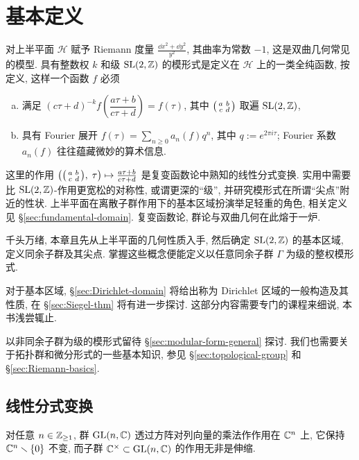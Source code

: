 
\chapter{基本定义}
对上半平面 $\mathcal{H}$ 赋予 Riemann 度量 $\frac{\dd x^2 + \dd y^2}{y^2}$, 其曲率为常数 $-1$, 这是双曲几何常见的模型. 具有整数权 $k$ 和级 $\operatorname{SL}(2,\mathbb{Z})$ 的模形式是定义在 $\mathcal{H}$ 上的一类全纯函数, 按定义, 这样一个函数 $f$ 必须
\begin{enumerate}[(a)]
	\item 满足 $(c\tau + d)^{-k} f\left( \dfrac{a\tau+b}{c\tau+d} \right) = f(\tau)$, 其中 $\bigl(\begin{smallmatrix} a & b \\ c & d \end{smallmatrix}\bigr)$ 取遍 $\operatorname{SL}(2,\mathbb{Z})$, 
	\item 具有 Fourier 展开 $f(\tau) = \sum_{n \geq 0} a_n(f) q^n$, 其中 $q := e^{2\pi i\tau}$; Fourier 系数 $a_n(f)$ 往往蕴藏微妙的算术信息.
\end{enumerate}
这里的作用 $\left( \bigl(\begin{smallmatrix} a & b \\ c & d \end{smallmatrix}\bigr), \; \tau \right) \mapsto \frac{a\tau+b}{c\tau+d}$ 是复变函数论中熟知的线性分式变换. 实用中需要比 $\operatorname{SL}(2,\mathbb{Z})$-作用更宽松的对称性, 或谓更深的``级'', 并研究模形式在所谓``尖点''附近的性状. 上半平面在离散子群作用下的基本区域扮演举足轻重的角色, 相关定义见 \S\ref{sec:fundamental-domain}. 复变函数论, 群论与双曲几何在此熔于一炉.

千头万绪, 本章且先从上半平面的几何性质入手, 然后确定 $\operatorname{SL}(2,\mathbb{Z})$ 的基本区域, 定义同余子群及其尖点. 掌握这些概念便能定义以任意同余子群 $\Gamma$ 为级的整权模形式.

对于基本区域, \S\ref{sec:Dirichlet-domain} 将给出称为 Dirichlet 区域的一般构造及其性质, 在 \S\ref{sec:Siegel-thm} 将有进一步探讨. 这部分内容需要专门的课程来细说, 本书浅尝辄止.

以非同余子群为级的模形式留待 \S\ref{sec:modular-form-general} 探讨. 我们也需要关于拓扑群和微分形式的一些基本知识, 参见 \S\ref{sec:topological-group} 和 \S\ref{sec:Riemann-basics}.

\section{线性分式变换}\label{sec:linear-fractional-transform}
对任意 $n \in \mathbb{Z}_{\geq 1}$, 群 $\operatorname{GL}(n,\mathbb{C})$ 透过方阵对列向量的乘法作作用在 $\mathbb{C}^n$ 上, 它保持 $\mathbb{C}^n \smallsetminus \{0\}$ 不变, 而子群 $\mathbb{C}^\times \subset \operatorname{GL}(n,\mathbb{C})$ 的作用无非是伸缩.

